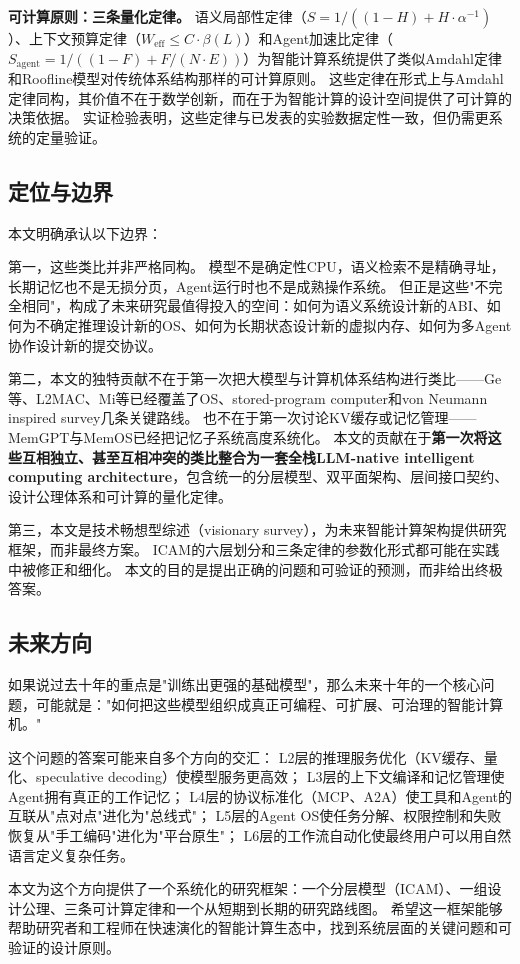 \textbf{可计算原则：三条量化定律。}
语义局部性定律（$S = 1/((1-H)+H\cdot\alpha^{-1})$）、上下文预算定律（$W_{\mathrm{eff}} \leq C \cdot \beta(L)$）和Agent加速比定律（$S_{\mathrm{agent}} = 1/((1-F)+F/(N\cdot E))$）为智能计算系统提供了类似Amdahl定律和Roofline模型对传统体系结构那样的可计算原则。
这些定律在形式上与Amdahl定律同构，其价值不在于数学创新，而在于为智能计算的设计空间提供了可计算的决策依据。
实证检验表明，这些定律与已发表的实验数据定性一致，但仍需更系统的定量验证。

\subsection{定位与边界}

本文明确承认以下边界：

第一，这些类比并非严格同构。
模型不是确定性CPU，语义检索不是精确寻址，长期记忆也不是无损分页，Agent运行时也不是成熟操作系统。
但正是这些"不完全相同"，构成了未来研究最值得投入的空间：如何为语义系统设计新的ABI、如何为不确定推理设计新的OS、如何为长期状态设计新的虚拟内存、如何为多Agent协作设计新的提交协议。

第二，本文的独特贡献不在于第一次把大模型与计算机体系结构进行类比——Ge等\cite{ge2023llmos}、L2MAC\cite{holt2024l2mac}、Mi等\cite{mi2025llmagentscomputersystems}已经覆盖了OS、stored-program computer和von Neumann inspired survey几条关键路线。
也不在于第一次讨论KV缓存或记忆管理——MemGPT\cite{memgpt2023}与MemOS\cite{memos2025}已经把记忆子系统高度系统化。
本文的贡献在于\textbf{第一次将这些互相独立、甚至互相冲突的类比整合为一套全栈LLM-native intelligent computing architecture}，包含统一的分层模型、双平面架构、层间接口契约、设计公理体系和可计算的量化定律。

第三，本文是技术畅想型综述（visionary survey），为未来智能计算架构提供研究框架，而非最终方案。
ICAM的六层划分和三条定律的参数化形式都可能在实践中被修正和细化。
本文的目的是提出正确的问题和可验证的预测，而非给出终极答案。

\subsection{未来方向}

如果说过去十年的重点是"训练出更强的基础模型"，那么未来十年的一个核心问题，可能就是："如何把这些模型组织成真正可编程、可扩展、可治理的智能计算机。"

这个问题的答案可能来自多个方向的交汇：
L2层的推理服务优化（KV缓存、量化、speculative decoding）使模型服务更高效；
L3层的上下文编译和记忆管理使Agent拥有真正的工作记忆；
L4层的协议标准化（MCP、A2A）使工具和Agent的互联从"点对点"进化为"总线式"；
L5层的Agent OS使任务分解、权限控制和失败恢复从"手工编码"进化为"平台原生"；
L6层的工作流自动化使最终用户可以用自然语言定义复杂任务。

本文为这个方向提供了一个系统化的研究框架：一个分层模型（ICAM）、一组设计公理、三条可计算定律和一个从短期到长期的研究路线图。
希望这一框架能够帮助研究者和工程师在快速演化的智能计算生态中，找到系统层面的关键问题和可验证的设计原则。
